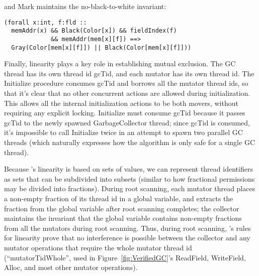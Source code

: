 and Mark maintains the no-black-to-white invariant:

\begin{verbatim}
(forall x:int, f:fld ::
  memAddr(x) && Black(Color[x]) && fieldIndex(f)
             && memAddr(mem[x][f]) ==>
  Gray(Color[mem[x][f]]) || Black(Color[mem[x][f]]))
\end{verbatim}

Finally, linearity plays a key role in establishing mutual exclusion.
The GC thread has its own thread id gcTid, and each mutator has its own thread id.
The Initialize procedure consumes gcTid and borrows all the mutator thread ids,
so that it's clear that no other concurrent actions are allowed during initialization.
This allows all the internal initialization actions to be both movers, without requiring any explicit locking.
Initialize must consume gcTid because it passes gcTid to the newly spawned GarbageCollector thread;
since gcTid is consumed, it's impossible to call Initialize twice in an attempt to spawn two parallel GC threads
(which naturally expresses how the algorithm is only safe for a single GC thread).

Because \civl's linearity is based on sets of values,
we can represent thread identifiers as sets that can be subdivided into subsets
(similar to how fractional permissions may be divided into fractions).
During root scanning, each mutator thread places a non-empty fraction of its thread id in a global variable,
and extracts the fraction from the global variable after root scanning completes;
the collector maintains the invariant that the global variable contains non-empty fractions from all the mutators during root scanning.
Thus, during root scanning, \civl's rules for linearity prove that no interference is possible
between the collector and any mutator operations that require the whole mutator thread id
(``mutatorTidWhole'', used in Figure~\ref{fig:VerifiedGC}'s ReadField, WriteField, Alloc,
and most other mutator operations).

